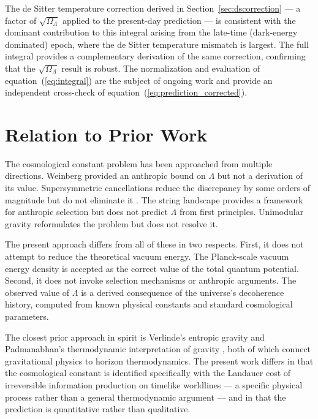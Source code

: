 \documentclass[12pt,a4paper]{article}
\begin{document}
The de Sitter temperature correction derived in
Section~\ref{sec:dscorrection} — a factor of $\sqrt{\Omega_\Lambda}$
applied to the present-day prediction — is consistent with the dominant
contribution to this integral arising from the late-time (dark-energy
dominated) epoch, where the de Sitter temperature mismatch is largest.
The full integral provides a complementary derivation of the same
correction, confirming that the $\sqrt{\Omega_\Lambda}$ result is robust.
The normalization and evaluation of equation~(\ref{eq:integral}) are the
subject of ongoing work and provide an independent cross-check of
equation~(\ref{eq:prediction_corrected}).

\section{Relation to Prior Work}
\label{sec:prior}

The cosmological constant problem has been approached from multiple
directions. Weinberg \citep{weinberg1989} provided an anthropic bound on
$\Lambda$ but not a derivation of its value. Supersymmetric cancellations
reduce the discrepancy by some orders of magnitude but do not eliminate
it \citep{witten2000}. The string landscape \citep{bousso2000} provides
a framework for anthropic selection but does not predict $\Lambda$ from
first principles. Unimodular gravity \citep{weinberg1989} reformulates
the problem but does not resolve it.

The present approach differs from all of these in two respects. First, it
does not attempt to reduce the theoretical vacuum energy. The Planck-scale
vacuum energy density is accepted as the correct value of the total quantum
potential. Second, it does not invoke selection mechanisms or anthropic
arguments. The observed value of $\Lambda$ is a derived consequence of
the universe's decoherence history, computed from known physical constants
and standard cosmological parameters.

The closest prior approach in spirit is Verlinde's entropic gravity
\citep{verlinde2011} and Padmanabhan's thermodynamic interpretation of
gravity \citep{padmanabhan2010}, both of which connect gravitational
physics to horizon thermodynamics. The present work differs in that the
cosmological constant is identified specifically with the Landauer cost
of irreversible information production on timelike worldlines — a
specific physical process rather than a general thermodynamic argument —
and in that the prediction is quantitative rather than qualitative.
\end{document}
